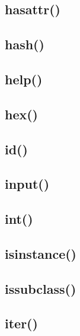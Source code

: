 \documentclass{article}
\begin{document}
\subsection{hasattr()}
%

\subsection{hash()}
%

\subsection{help()}
%

\subsection{hex()}
%

\subsection{id()}
%

\subsection{input()}
%

\subsection{int()}
%

\subsection{isinstance()}
%

\subsection{issubclass()}
%

\subsection{iter()}
%
\end{document}
